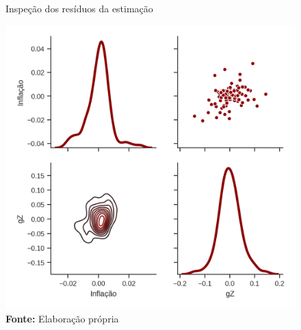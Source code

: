 

\begin{figure}[htb]
	\centering
	\caption{Inspeção dos resíduos da estimação}
	\label{residuos_infla}
	\includegraphics[height=.4\textheight]{../../Modelo/SeriesTemporais/figs/Residuos_4VECM_Infla.png}
	\caption*{\textbf{Fonte:} Elaboração própria}
\end{figure}


